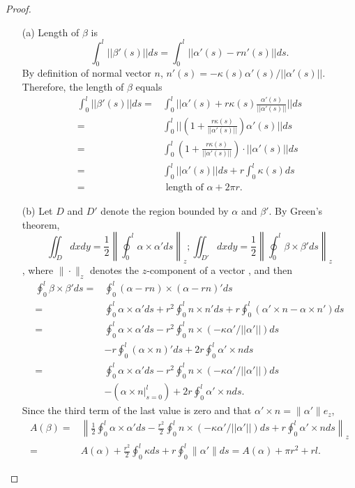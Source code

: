 \documentclass[12pt,a4paper]{article}
\begin{document}
\begin{proof}
\begin{enumerate}
\item[]
\item[(a)] Length of $\beta$ is 
\[\int_0^l ||\beta'(s)|| ds = \int_0^l ||\alpha'(s)-rn'(s)||ds.\]
By definition of normal vector $n$, $n'(s)=-\kappa(s)\alpha'(s)/||\alpha'(s)||$. Therefore, the length of $\beta$ equals
\begin{align*}
\int_0^l ||\beta'(s)|| ds =& \int_0^l ||\alpha'(s)+r\kappa(s)\frac{\alpha'(s)}{||\alpha'(s)||}|| ds \\
 =& \int_0^l ||(1+\frac{r\kappa(s)}{||\alpha'(s)||})\alpha'(s)|| ds\\
 =& \int_0^l (1+\frac{r\kappa(s)}{||\alpha'(s)||})\cdot ||\alpha'(s)|| ds\\
 =& \int_0^l ||\alpha'(s)|| ds + r\int_0^l \kappa(s) ds\\
 =& \mbox{ length of $\alpha$} + 2\pi r.
\end{align*}
\item[(b)]
Let $D$ and $D'$ denote the region bounded by $\alpha$ and $\beta'$. By Green's theorem, 
$$
\iint_D dxdy = \frac 12\left\|\oint_0^l \alpha\times\alpha' ds\right\|_z; \iint_{D'} dxdy = \frac 12\left\|\oint_0^l \beta\times\beta' ds\right\|_z
$$
, where $\|\cdot\|_z$ denotes the $z$-component of a vector , and then
\begin{align*}
\oint_0^l \beta\times\beta' ds =& \oint_0^l (\alpha - rn)\times(\alpha - rn)'ds
\\=& \oint_0^l \alpha\times\alpha' ds + r^2\oint_0^l n\times n' ds + r\oint_0^l (\alpha'\times n - \alpha\times n') ds
\\=& \oint_0^l \alpha\times\alpha' ds - r^2\oint_0^l n\times(-\kappa\alpha'/||\alpha'||) ds 
\\&- r\oint_0^l (\alpha\times n)'ds + 2r\oint_0^l\alpha'\times n ds
\\=& \oint_0^l \alpha\times\alpha' ds - r^2\oint_0^l n\times(-\kappa\alpha'/||\alpha'||) ds 
\\&- (\alpha\times n\vert_{s=0}^l) + 2r\oint_0^l\alpha'\times n ds.
\end{align*}
Since the third term of the last value is zero and that $\alpha'\times n = \|\alpha'\|e_z$, 
\begin{align*}
A(\beta) =& \left\|\frac 12\oint_0^l \alpha\times\alpha' ds - \frac{r^2}2\oint_0^l n\times(-\kappa\alpha'/||\alpha'||) ds + r\oint_0^l\alpha'\times n ds\right\|_z
\\=& A(\alpha) + \frac{r^2}2\oint_0^l \kappa ds + r\oint_0^l\|\alpha'\| ds = A(\alpha) + \pi r^2 + rl.
\end{align*}

\end{enumerate}

\end{proof}
\end{document}
